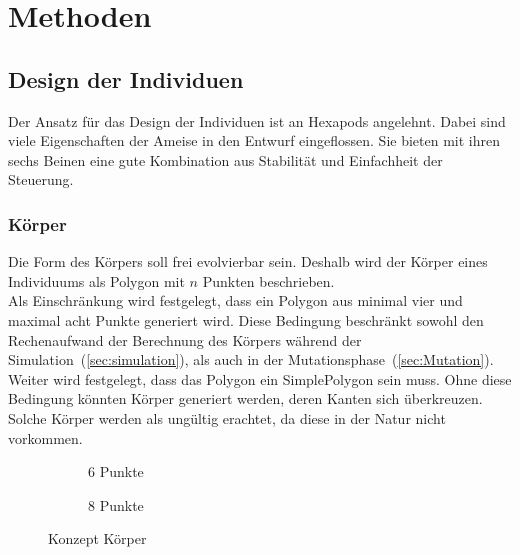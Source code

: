 %
%


\chapter{Methoden\label{sec:method}}

  \section{Design der Individuen}

    Der Ansatz für das Design der Individuen ist an \Glspl{Hexapod} angelehnt.
    Dabei sind viele Eigenschaften der Ameise in den Entwurf eingeflossen.
    Sie bieten mit ihren sechs Beinen eine gute Kombination aus Stabilität und Einfachheit der Steuerung.

    \subsection{Körper\label{sub:DesignBody}}

      Die Form des Körpers soll frei evolvierbar sein.
      Deshalb wird der Körper eines Individuums als Polygon mit \(n\) Punkten beschrieben.
      \\
      Als Einschränkung wird festgelegt, dass ein Polygon aus minimal vier und maximal acht Punkte generiert wird.
      Diese Bedingung beschränkt sowohl den Rechenaufwand der Berechnung des Körpers während der Simulation~(\vref{sec:simulation}),
      als auch in der Mutationsphase~(\vref{sec:Mutation}).
      \\
      Weiter wird festgelegt, dass das Polygon ein \gls{SimplePolygon} sein muss.
      Ohne diese Bedingung könnten Körper generiert werden, deren Kanten sich überkreuzen.
      Solche Körper werden als ungültig erachtet, da diese in der Natur nicht vorkommen.

      \begin{figure}[H]
        \centering
        \begin{subfigure}[b]{0.45\textwidth}
          \centering
          
          \caption{6 Punkte\label{fig:ConceptBodyPoints6}}
        \end{subfigure}
        \qquad
        \begin{subfigure}[b]{0.45\textwidth}
          \centering
          
          \caption{8 Punkte\label{fig:ConceptBodyPoints8}}
        \end{subfigure}
        \caption{Konzept Körper\label{fig:ConceptBodyPoints}}
      \end{figure}


